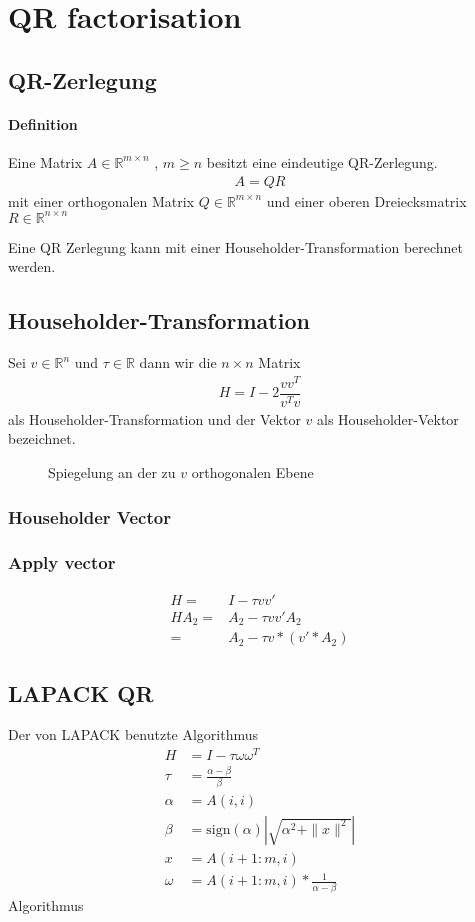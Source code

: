 \chapter{QR factorisation}

\section{QR-Zerlegung}
\subsubsection{Definition}
Eine Matrix $A \in \mathbb{R}^{m \times n}$ , $m \ge n$ besitzt eine eindeutige QR-Zerlegung.
\begin{align}
	A = QR
\end{align}
mit einer orthogonalen Matrix $ Q \in \mathbb{R}^{m \times n} $ und einer oberen Dreiecksmatrix $ R \in \mathbb{R}^{n \times n}$ \cite{num1}

Eine QR Zerlegung kann mit einer Householder-Transformation berechnet werden.

\section{Householder-Transformation}
Sei $v \in \mathbb{R}^n$ und $\tau \in \mathbb{R}$ dann wir die $n \times n$ Matrix 
\begin{align}
	H = I - 2 \dfrac{vv^T}{v^Tv}
\end{align}
als Householder-Transformation und der Vektor $v$ als Householder-Vektor bezeichnet.
\begin{figure} 
	\centering
	
	\caption{Spiegelung an der zu $v$ orthogonalen Ebene }
	\label{fig:HHolder}
\end{figure}
\subsection{Householder Vector}
\subsection{Apply vector}
\begin{align}
H =& I - \tau vv'\\ 
H A_2 =& A_2 - \tau vv' A_2\\
=& A_2 - \tau v*(v'*A_2)
\end{align}

\section{LAPACK QR}
Der von LAPACK benutzte Algorithmus \cite{DGEQR2}
\begin{align}
	H &= I - \tau \omega \omega^T \\
	\tau &= \frac{\alpha - \beta}{\beta} \\
	\alpha &= A(i,i)\\
	\beta &= \text{sign}(\alpha) \left|\sqrt{\alpha^2 + \|x\|^2}\right|\\
	x &= A(i+1:m,i)\\
	\omega &= A(i+1:m,i) * \frac{1}{\alpha - \beta}
\end{align}
Algorithmus

